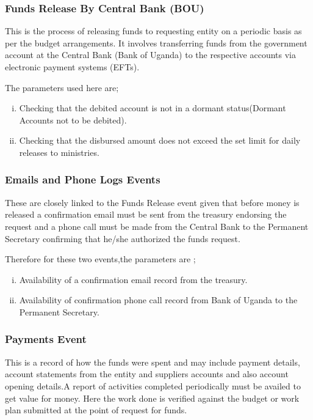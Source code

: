 \subsubsection{Funds Release By Central Bank (BOU)}

\noindent This is the process of releasing funds to requesting entity on a periodic basis as per the budget arrangements. It involves transferring funds from the government account at the Central Bank (Bank of Uganda) to the respective accounts via electronic payment systems (EFTs).

\noindent The parameters used here are;

\begin{enumerate}[(i)]
\item Checking that the debited account is not in a dormant status(Dormant Accounts not to be debited).
\item Checking that the disbursed amount does not exceed the set limit for daily releases to ministries.
\end{enumerate}

\subsubsection{Emails and Phone Logs Events}

\noindent These are closely linked to the Funds Release event given that before money is released a confirmation email must be sent from the treasury endorsing the request and a phone call must be made from the Central Bank to the Permanent Secretary confirming that he/she authorized the funds request.

\noindent Therefore for these two events,the parameters are ;

\begin{enumerate}[(i)]
\item Availability of a confirmation email record from the treasury.
\item Availability of confirmation phone call record from Bank of Uganda to the Permanent Secretary.
\end{enumerate}

\subsubsection{Payments Event}

\noindent This is a record of how the funds were spent and may include payment details, account statements from the entity and suppliers accounts and also account opening details.A report of activities completed periodically must be availed to get value for money. Here the work done is verified against the budget or work plan submitted at the point of request for funds.

